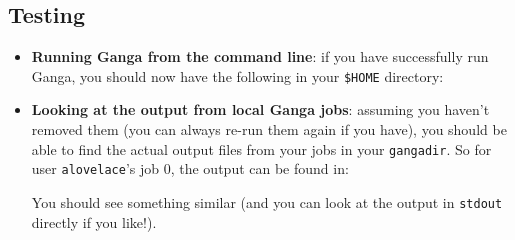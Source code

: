 \subsection{Testing}
\label{first-steps-hello-worlds---testing}

\begin{itemize}
\item
  \textbf{Running Ganga from the command line}: if you have successfully
  run Ganga, you should now have the following in your \texttt{\$HOME}
  directory:

\begin{Shaded}
\begin{Highlighting}[]
\NormalTok{$ } 
\NormalTok{$ } 
\NormalTok{$ } 
  
\end{Highlighting}
\end{Shaded}
\item
  \textbf{Looking at the output from local Ganga jobs}: assuming you
  haven't removed them (you can always re-run them again if you have),
  you should be able to find the actual output files from your jobs in
  your \texttt{gangadir}. So for user \texttt{alovelace}'s job 0, the
  output can be found in:

\begin{Shaded}
\begin{Highlighting}[]
\NormalTok{$ } 
 
\end{Highlighting}
\end{Shaded}

  You should see something similar (and you can look at the output in
  \texttt{stdout} directly if you like!).
\end{itemize}
